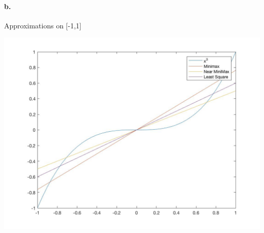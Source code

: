 \documentclass{article}
\begin{document}
\paragraph{b. } Approximations on [-1,1]

\includegraphics[width=\textwidth]{7b}
\end{document}
